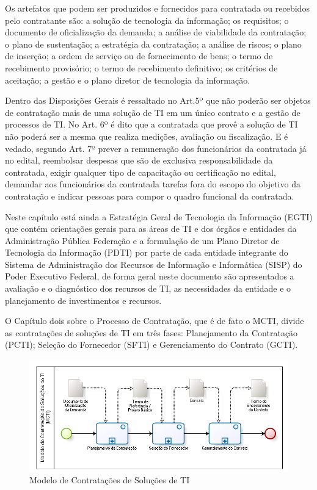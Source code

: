 Os artefatos que podem ser produzidos e fornecidos para contratada ou recebidos pelo contratante são: a solução de tecnologia da informação; os requisitos; o documento de oficialização da demanda; a análise de viabilidade da contratação; o plano de sustentação; a estratégia da contratação; a análise de riscos; o plano de inserção; a ordem de serviço ou de fornecimento de bens; o termo de recebimento provisório; o termo de recebimento definitivo; os critérios de aceitação; a gestão e o plano diretor de tecnologia da informação.

Dentro das Disposições Gerais é ressaltado no Art.5º que não poderão ser objetos de contratação mais de uma solução de TI em um único contrato e a gestão de processos de TI.  No Art. 6º é dito que a contratada que provê a solução de TI não poderá ser a mesma que realiza medições, avaliação ou fiscalização. E é vedado, segundo Art. 7º prever a remuneração dos funcionários da contratada já no edital, reembolsar despesas que são de exclusiva responsabilidade da contratada, exigir qualquer tipo de capacitação ou certificação no edital, demandar aos funcionários da contratada tarefas fora do escopo do objetivo da contratação  e indicar pessoas para compor o quadro funcional da contratada. 

Neste capítulo está ainda a Estratégia Geral de Tecnologia da Informação (EGTI) que contém orientações gerais para as áreas de TI e dos órgãos e entidades da Administração Pública Federação e a formulação de um Plano Diretor de Tecnologia da Informação (PDTI) por parte de cada entidade integrante do Sistema de Administração dos Recursos de Informação e Informática (SISP) do Poder Executivo Federal, de forma geral neste documento são apresentados a avaliação e o diagnóstico dos recursos de TI, as necessidades da entidade e o planejamento de investimentos e recursos.

O Capítulo dois sobre o Processo de Contratação, que é de fato o MCTI, divide as contratações de soluções de TI em três fases: Planejamento da Contratação (PCTI); Seleção do Fornecedor (SFTI) e Gerenciamento do Contrato (GCTI).

\begin{figure}[h]
		\centering
		\label{fig05}
			\includegraphics[scale=0.8]{figuras/MCTI.png}
		\caption{Modelo de Contratações de Soluções de TI   \cite{mcti}}
\end{figure}


